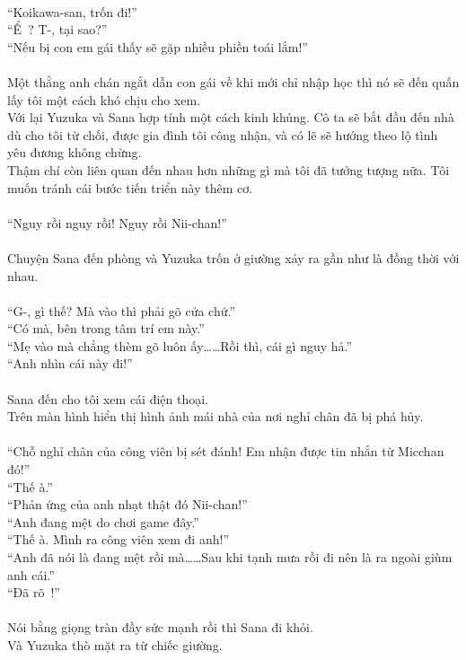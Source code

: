 \documentclass[12pt,a4paper, twosides]{book}
\begin{document}
\\
“Koikawa-san, trốn đi!”\\
“Ể~? T-, tại sao?”\\
“Nếu bị con em gái thấy sẽ gặp nhiều phiền toái lắm!”\\
\\
Một thằng anh chán ngắt dẫn con gái về khi mới chỉ nhập học thì nó sẽ đến quấn lấy tôi một cách khó chịu cho xem.\\
Với lại Yuzuka và Sana hợp tính một cách kinh khủng. Cô ta sẽ bắt đầu đến nhà dù cho tôi từ chối, được gia đình tôi công nhận, và có lẽ sẽ hướng theo lộ tình yêu đương không chừng.\\
Thậm chí còn liên quan đến nhau hơn những gì mà tôi đã tưởng tượng nữa. Tôi muốn tránh cái bước tiến triển này thêm cơ.\\
\\
“Nguy rồi nguy rồi! Nguy rồi Nii-chan!”\\
\\
Chuyện Sana đến phòng và Yuzuka trốn ở giường xảy ra gần như là đồng thời với nhau.\\
\\
“G-, gì thế? Mà vào thì phải gõ cửa chứ.”\\
“Có mà, bên trong tâm trí em này.”\\
“Mẹ vào mà chẳng thèm gõ luôn ấy……Rồi thì, cái gì nguy hả.”\\
“Anh nhìn cái này đi!”\\
\\
Sana đến cho tôi xem cái điện thoại.\\
Trên màn hình hiển thị hình ảnh mái nhà của nơi nghỉ chân đã bị phá hủy.\\
\\
“Chỗ nghỉ chân của công viên bị sét đánh! Em nhận được tin nhắn từ Micchan đó!”\\
“Thế à.”\\
“Phản ứng của anh nhạt thật đó Nii-chan!”\\
“Anh đang mệt do chơi game đây.”\\
“Thế à. Mình ra công viên xem đi anh!”\\
“Anh đã nói là đang mệt rồi mà……Sau khi tạnh mưa rồi đi nên là ra ngoài giùm anh cái.”\\
“Đã rõ~!”\\
\\
Nói bằng giọng tràn đầy sức mạnh rồi thì Sana đi khỏi.\\
Và Yuzuka thò mặt ra từ chiếc giường.\\
\end{document}
